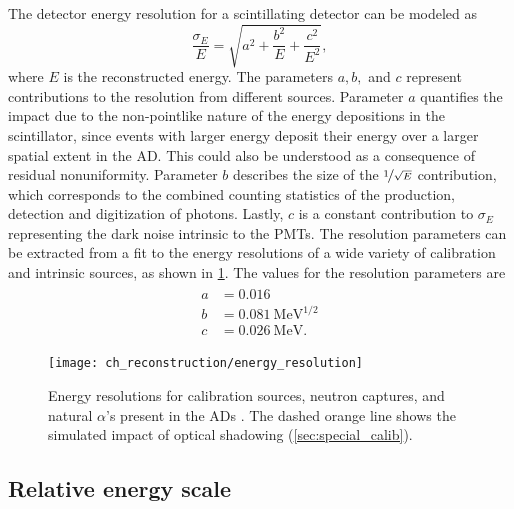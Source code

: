 The detector energy resolution for a scintillating detector can be modeled as
\cite{energy_resolution}
\begin{equation}
    \frac{\sigma_E}{E} = \sqrt{a^2 + \frac{b^2}{E} + \frac{c^2}{E^2}},
\end{equation}
where $E$ is the reconstructed energy.
The parameters $a,b,$ and $c$ represent contributions to the resolution
from different sources.
Parameter $a$ quantifies the impact due to the non-pointlike nature
of the energy depositions in the scintillator,
since events with larger energy deposit their energy over a larger spatial extent
in the AD.
This could also be understood as a consequence of residual nonuniformity.
Parameter $b$ describes the size of the $\nicefrac{1}{\sqrt{E}}$ contribution,
which corresponds to the combined counting statistics of
the production, detection and digitization of photons.
Lastly, $c$ is a constant contribution to $\sigma_E$
representing the dark noise intrinsic to the PMTs.
The resolution parameters can be extracted from a fit
to the energy resolutions of a wide variety of calibration and intrinsic sources,
as shown in \cref{fig:resolution}.
The values for the resolution parameters are \cite{ngd2016}
\begin{align}\label{eq:resolution_params}
    \begin{split}
        a &= 0.016 \\
        b &= \SI{0.081}{\MeV\tothe{1/2}} \\
        c &= \SI{0.026}{\MeV}.
    \end{split}
\end{align}

\begin{figure}
    \centering
    \texttt{[image: ch\_reconstruction/energy\_resolution]}
    \caption{Energy resolutions for calibration sources, neutron captures,
        and natural $\alpha$'s present in the ADs \cite{ngd2016}.
        The dashed orange line shows the simulated impact
        of optical shadowing (\cref{sec:special_calib}).
    }
    \label{fig:resolution}
\end{figure}


\subsection{Relative energy scale}
\label{subsec:rel_energyscale}

